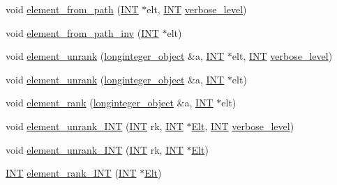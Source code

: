 \begin{DoxyCompactItemize}
\item 
void \mbox{\hyperlink{classsims_a4a9bc25b1b8e61ba34d6d3d9f9fb8ab8}{element\+\_\+from\+\_\+path}} (\mbox{\hyperlink{galois_8h_a09fddde158a3a20bd2dcadb609de11dc}{I\+NT}} $\ast$elt, \mbox{\hyperlink{galois_8h_a09fddde158a3a20bd2dcadb609de11dc}{I\+NT}} \mbox{\hyperlink{simeon_8_c_a818073fbcc2f439e7c56952f67386122}{verbose\+\_\+level}})
\item 
void \mbox{\hyperlink{classsims_affad99d2bb7ef403201daefaeccb4f79}{element\+\_\+from\+\_\+path\+\_\+inv}} (\mbox{\hyperlink{galois_8h_a09fddde158a3a20bd2dcadb609de11dc}{I\+NT}} $\ast$elt)
\item 
void \mbox{\hyperlink{classsims_ae7e72ffe2204f17d3e4d19360c59f147}{element\+\_\+unrank}} (\mbox{\hyperlink{classlonginteger__object}{longinteger\+\_\+object}} \&a, \mbox{\hyperlink{galois_8h_a09fddde158a3a20bd2dcadb609de11dc}{I\+NT}} $\ast$elt, \mbox{\hyperlink{galois_8h_a09fddde158a3a20bd2dcadb609de11dc}{I\+NT}} \mbox{\hyperlink{simeon_8_c_a818073fbcc2f439e7c56952f67386122}{verbose\+\_\+level}})
\item 
void \mbox{\hyperlink{classsims_ae4ed39ddd4f985a306c6edae4d9f167e}{element\+\_\+unrank}} (\mbox{\hyperlink{classlonginteger__object}{longinteger\+\_\+object}} \&a, \mbox{\hyperlink{galois_8h_a09fddde158a3a20bd2dcadb609de11dc}{I\+NT}} $\ast$elt)
\item 
void \mbox{\hyperlink{classsims_a00fb332192d01becb17b6a059482fc8d}{element\+\_\+rank}} (\mbox{\hyperlink{classlonginteger__object}{longinteger\+\_\+object}} \&a, \mbox{\hyperlink{galois_8h_a09fddde158a3a20bd2dcadb609de11dc}{I\+NT}} $\ast$elt)
\item 
void \mbox{\hyperlink{classsims_a435d84bb7bf7292f14593b2a4344151f}{element\+\_\+unrank\+\_\+\+I\+NT}} (\mbox{\hyperlink{galois_8h_a09fddde158a3a20bd2dcadb609de11dc}{I\+NT}} rk, \mbox{\hyperlink{galois_8h_a09fddde158a3a20bd2dcadb609de11dc}{I\+NT}} $\ast$\mbox{\hyperlink{simeon_8_c_aec1406935bdb1fee3561fcb840964100}{Elt}}, \mbox{\hyperlink{galois_8h_a09fddde158a3a20bd2dcadb609de11dc}{I\+NT}} \mbox{\hyperlink{simeon_8_c_a818073fbcc2f439e7c56952f67386122}{verbose\+\_\+level}})
\item 
void \mbox{\hyperlink{classsims_aac07b378ca225ec7f6f992ad08f31869}{element\+\_\+unrank\+\_\+\+I\+NT}} (\mbox{\hyperlink{galois_8h_a09fddde158a3a20bd2dcadb609de11dc}{I\+NT}} rk, \mbox{\hyperlink{galois_8h_a09fddde158a3a20bd2dcadb609de11dc}{I\+NT}} $\ast$\mbox{\hyperlink{simeon_8_c_aec1406935bdb1fee3561fcb840964100}{Elt}})
\item 
\mbox{\hyperlink{galois_8h_a09fddde158a3a20bd2dcadb609de11dc}{I\+NT}} \mbox{\hyperlink{classsims_a8ff29017c518c9ed459a7ea9eade2974}{element\+\_\+rank\+\_\+\+I\+NT}} (\mbox{\hyperlink{galois_8h_a09fddde158a3a20bd2dcadb609de11dc}{I\+NT}} $\ast$\mbox{\hyperlink{simeon_8_c_aec1406935bdb1fee3561fcb840964100}{Elt}})

\end{DoxyCompactItemize}

